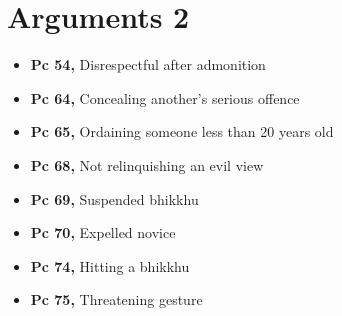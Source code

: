 \chapter{Arguments 2}

\begin{itemize}
\tightlist
\item
  \textbf{Pc 54,} Disrespectful after admonition
\item
  \textbf{Pc 64,} Concealing another's serious offence
\item
  \textbf{Pc 65,} Ordaining someone less than 20 years old
\item
  \textbf{Pc 68,} Not relinquishing an evil view
\item
  \textbf{Pc 69,} Suspended bhikkhu
\item
  \textbf{Pc 70,} Expelled novice
\item
  \textbf{Pc 74,} Hitting a bhikkhu
\item
  \textbf{Pc 75,} Threatening gesture
\end{itemize}

